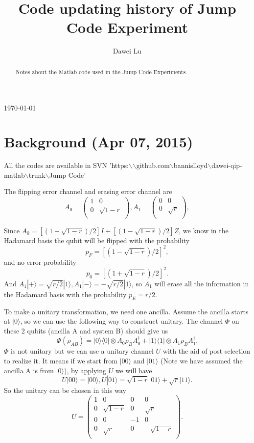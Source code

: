 \documentclass[prl,onecolumn]{revtex4-1}
\newcommand{\bra}[1]{\langle #1|}
\newcommand{\ket}[1]{|#1\rangle}
\newcommand{\dir}{$\backslash$}
\newcommand{\be}{\begin{equation}}
\newcommand{\ee}{\end{equation}}
\begin{document}
\title{Code updating history of Jump Code Experiment}
\author{Dawei Lu}

\begin{abstract}
Notes about the Matlab code used in the Jump Code Experiments.
\end{abstract}
\today

\maketitle

\section{Background (Apr 07, 2015)}

All the codes are available in SVN 'https:\dir \dir github.com\dir bannislloyd\dir dawei-qip-matlab\dir trunk\dir Jump Code'

The flipping error channel and erasing error channel are 
\be
A_0 = \left(
         \begin{array}{cc}
           1 & 0 \\
           0 & \sqrt{1-r} \\
         \end{array}
       \right),
A_1 = \left(
         \begin{array}{cc}
           0 & 0 \\
           0 & \sqrt{r} \\
         \end{array}
       \right),       
\ee

Since $A_0 = [(1+\sqrt{1-r})/2]I+[(1-\sqrt{1-r})/2]Z$, we know in the Hadamard basis the qubit will be flipped with the probability 
\be
p_F = [(1-\sqrt{1-r})/2]^2,
\ee
and no error probability 
\be
p_0 = [(1+\sqrt{1-r})/2]^2.
\ee
And $A_1\ket{+}=\sqrt{r/2}\ket{1}, A_1\ket{-}=-\sqrt{r/2}\ket{1}$, so $A_1$ will erase all the information in the Hadamard basis with the probability $p_E = r/2$.

To make a unitary transformation, we need one ancilla. Assume the ancilla starts at $\ket{0}$, so we can use the following way to construct unitary. The channel $\Phi$ on these 2 qubits (ancilla A and system B) should give us
\be
\Phi(\rho_{AB}) = \ket{0}\bra{0}\otimes A_0\rho_BA_0^{\dagger} +\ket{1}\bra{1} \otimes A_1\rho_BA_1^{\dagger}.
\ee
$\Phi$ is not unitary but we can use a unitary channel $U$ with the aid of post selection to realize it. It means if we start from $\ket{00}$ and $\ket{01}$ (Note we have assumed the ancilla A is from $\ket{0}$), by applying $U$ we will have
\be
U\ket{00} = \ket{00}, U\ket{01} = \sqrt{1-r}\ket{01}+\sqrt{r}\ket{11}.
\ee
So the unitary can be chosen in this way
\be
U = \left(
      \begin{array}{cccc}
        1 & 0 & 0 & 0 \\
        0 & \sqrt{1-r} & 0 & \sqrt{r} \\
        0 & 0 & -1 & 0 \\
        0 & \sqrt{r} & 0 & -\sqrt{1-r} \\
      \end{array}
    \right).
\ee
\end{document}
